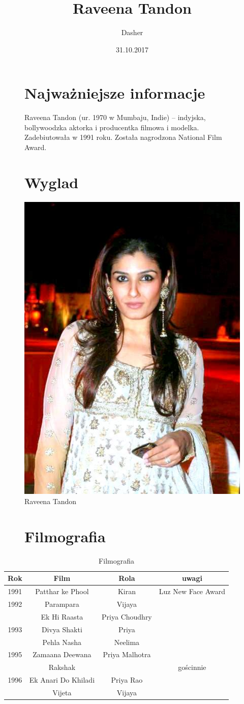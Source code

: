 \documentclass[a4paper,12pt]{article}
\title{Raveena Tandon}
\author{Dasher}
\date{31.10.2017}
\begin{document}
\begin{figure}
\maketitle
\end{figure}

\begin{figure}
\section{Najważniejsze informacje}
Raveena Tandon (ur. 1970 w Mumbaju, Indie) – indyjska, bollywoodzka aktorka i producentka filmowa i modelka. Zadebiutowała w 1991 roku. Została nagrodzona National Film Award.
\end{figure}

\begin{figure}
\section{Wyglad}
\centering
\includegraphics[width=0.25\hsize]{RaveenaTandon.jpg}
\caption{Raveena Tandon}
\end{figure}

\begin{figure}
\section{Filmografia}
\end{figure}
\begin{table}
	\begin{tabular}{c|c|c|c}
	\hline
	\textbf{Rok}&\textbf{Film}&\textbf{Rola}&\textbf{uwagi}\\
	\hline
	1991&Patthar ke Phool&Kiran&Luz New Face Award\\
	\hline
	1992&Parampara&Vijaya\\
	\hline
	&Ek Hi Raasta&Priya Choudhry&\\
	1993&Divya Shakti&Priya\\
	&Pehla Nasha&Neelima&\\
	\hline
	1995&Zamaana Deewana&Priya Malhotra	&\\
	\hline
	&Rakshak&&gościnnie\\
	1996&Ek Anari Do Khiladi&Priya Rao&\\
	&Vijeta&Vijaya&\\
	\end{tabular}
\caption{Filmografia}
\end{table}

\begin{figure}
\tableofcontents
\listoffigures
\listoftables
\end{figure}
\end{document}
